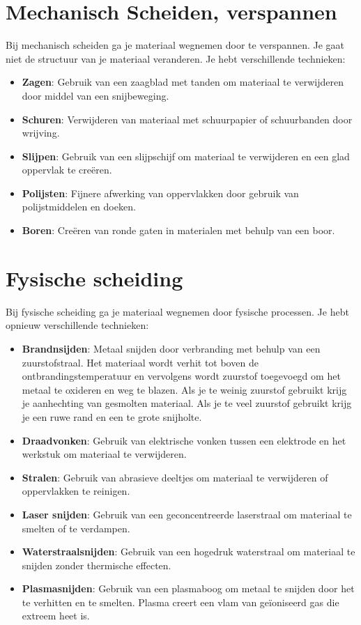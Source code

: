 \documentclass[a4paper,12pt,twoside]{report}
\begin{document}
\section{Mechanisch Scheiden, verspannen}
Bij mechanisch scheiden ga je materiaal wegnemen door te verspannen.
Je gaat niet de structuur van je materiaal veranderen. 
Je hebt verschillende technieken:
\begin{itemize}
  \item \textbf{Zagen}: Gebruik van een zaagblad met tanden om materiaal te verwijderen door middel van een snijbeweging.
  \item \textbf{Schuren}: Verwijderen van materiaal met schuurpapier of schuurbanden door wrijving.
  \item \textbf{Slijpen}: Gebruik van een slijpschijf om materiaal te verwijderen en een glad oppervlak te creëren.
  \item \textbf{Polijsten}: Fijnere afwerking van oppervlakken door gebruik van polijstmiddelen en doeken.
  \item \textbf{Boren}: Creëren van ronde gaten in materialen met behulp van een boor.
\end{itemize}


\section{Fysische scheiding}
Bij fysische scheiding ga je materiaal wegnemen door fysische processen.
Je hebt opnieuw verschillende technieken:
\begin{itemize}
  \item \textbf{Brandnsijden}: Metaal snijden door verbranding met behulp van een zuurstofstraal.
  Het materiaal wordt verhit tot boven de ontbrandingstemperatuur en vervolgens wordt zuurstof toegevoegd om het metaal te oxideren en weg te blazen.
  Als je te weinig zuurstof gebruikt krijg je aanhechting van gesmolten materiaal.
  Als je te veel zuurstof gebruikt krijg je een ruwe rand en een te grote snijholte.
  \item \textbf{Draadvonken}: Gebruik van elektrische vonken tussen een elektrode en het werkstuk om materiaal te verwijderen.
  \item \textbf{Stralen}: Gebruik van abrasieve deeltjes om materiaal te verwijderen of oppervlakken te reinigen.
  \item \textbf{Laser snijden}: Gebruik van een geconcentreerde laserstraal om materiaal te smelten of te verdampen.
  \item \textbf{Waterstraalsnijden}: Gebruik van een hogedruk waterstraal om materiaal te snijden zonder thermische effecten.
  \item \textbf{Plasmasnijden}: Gebruik van een plasmaboog om metaal te snijden door het te verhitten en te smelten.
  Plasma creert een vlam van geïoniseerd gas die extreem heet is.
\end{itemize}
\end{document}
